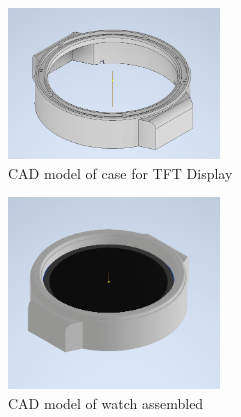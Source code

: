 \documentclass[12pt, titlepage]{article}
\begin{document}
\begin{figure}[H]
	\begin{center}
		 \includegraphics[width=0.5\textwidth]{DisplayCaseCAD}
		\caption{CAD model of case for TFT Display}
		\label{DisplayCaseCAD} 
	\end{center}
\end{figure}

\begin{figure}[H]
	\begin{center}
		 \includegraphics[width=0.5\textwidth]{WatchCAD2}
		\caption{CAD model of watch assembled}
		\label{WatchCAD2} 
	\end{center}
\end{figure}
\end{document}
